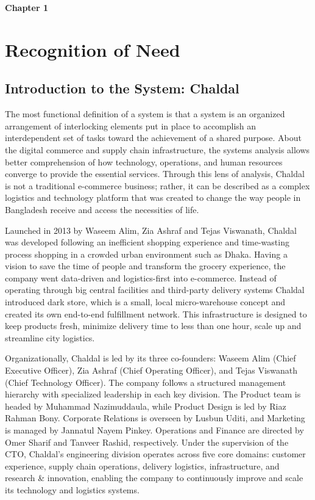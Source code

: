 \documentclass[12pt,a4paper]{article}
\begin{document}
\newpage
{} %
\setcounter{page}{1} %


{\Large\bfseries\color{RoyalBlue}Chapter 1}
\vspace{0.8em}
\section{Recognition of Need}
\vspace{0.6em}
\subsection{Introduction to the System: Chaldal}

The most functional definition of a system is that a system is an organized arrangement of interlocking elements put in place to accomplish an interdependent set of tasks toward the achievement of a shared purpose. About the digital commerce and supply chain infrastructure, the systems analysis allows better comprehension of how technology, operations, and human resources converge to provide the essential services. Through this lens of analysis, Chaldal is not a traditional e-commerce business; rather, it can be described as a complex logistics and technology platform that was created to change the way people in Bangladesh receive and access the necessities of life.

Launched in 2013 by Waseem Alim, Zia Ashraf and Tejas Viswanath, Chaldal was developed following an inefficient shopping experience and time-wasting process shopping in a crowded urban environment such as Dhaka. Having a vision to save the time of people and transform the grocery experience, the company went data-driven and logistics-first into e-commerce. Instead of operating through big central facilities and third-party delivery systems Chaldal introduced dark store, which is a small, local micro-warehouse concept and created its own end-to-end fulfillment network. This infrastructure is designed to keep products fresh, minimize delivery time to less than one hour, scale up and streamline city logistics.

Organizationally, Chaldal is led by its three co-founders: Waseem Alim (Chief Executive Officer), Zia Ashraf (Chief Operating Officer), and Tejas Viswanath (Chief Technology Officer). The company follows a structured management hierarchy with specialized leadership in each key division. The Product team is headed by Muhammad Nazimuddaula, while Product Design is led by Riaz Rahman Bony. Corporate Relations is overseen by Lusbun Uditi, and Marketing is managed by Jannatul Nayem Pinkey. Operations and Finance are directed by Omer Sharif and Tanveer Rashid, respectively. Under the supervision of the CTO, Chaldal's engineering division operates across five core domains: customer experience, supply chain operations, delivery logistics, infrastructure, and research \& innovation, enabling the company to continuously improve and scale its technology and logistics systems.
\end{document}
